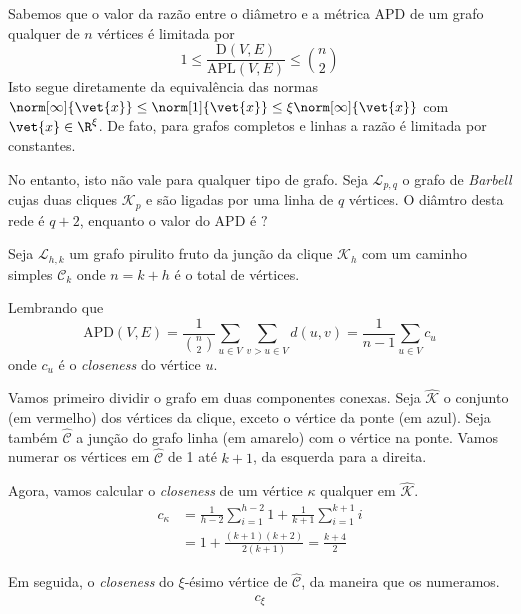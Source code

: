 \documentclass[l15, tikzdraw]{homework}
\begin{document}
	\subquest{} %
	Sabemos que o valor da razão entre o diâmetro e a métrica APD de um grafo qualquer de $n$ vértices é limitada por
		$$1 \le \frac{\text{D}(V, E)}{\text{APL}(V, E)} \le \binom{n}{2}$$
	Isto segue diretamente da equivalência das normas $\norm[\infty]{\vet{x}} \le \norm[1]{\vet{x}} \le \xi \norm[\infty]{\vet{x}}$ com $\vet{x} \in \R^\xi$. De fato, para grafos completos e linhas a razão é limitada por constantes.\par

	No entanto, isto não vale para qualquer tipo de grafo. Seja $\mathcal{L}_{p, q}$ o grafo de \textit{Barbell} cujas duas cliques $\mathcal{K}_p$ e são ligadas por uma linha de $q$ vértices. O diâmtro desta rede é $q + 2$, enquanto o valor do APD é $?$

	\subquest{} %
	Seja $\mathcal{L}_{h, k}$ um grafo pirulito fruto da junção da clique $\mathcal{K}_h$ com um caminho simples $\mathcal{C}_{k}$ onde $n = k + h$ é o total de vértices.
	
	\begin{fig}
		\resizebox{.66\textwidth}{!}{
			
		}
	\end{fig}

	Lembrando que
		$$\text{APD}(V, E) = \frac{1}{\binom{n}{2}} \sum_{u \in V} \sum_{v > u \in V} d(u, v) = \frac{1}{n - 1} \sum_{u \in V} c_u$$
	onde $c_u$ é o \textit{closeness} do vértice $u$.\par

	Vamos primeiro dividir o grafo em duas componentes conexas. Seja $\hat{\mathcal{K}}$ o conjunto (em vermelho) dos vértices da clique, exceto o vértice da ponte (em azul). Seja também $\hat{\mathcal{C}}$ a junção do grafo linha (em amarelo) com o vértice na ponte. Vamos numerar os vértices em $\hat{\mathcal{C}}$ de 1 até $k + 1$, da esquerda para a direita.\par

	Agora, vamos calcular o \textit{closeness} de um vértice $\kappa$ qualquer em $\hat{\mathcal{K}}$.
	\begin{align*}
		c_\kappa &= \frac{1}{h - 2} \sum_{i = 1}^{h - 2} 1 + \frac{1}{k + 1} \sum_{i = 1}^{k + 1} i\\
		&= 1 + \frac{(k + 1) (k + 2)}{2 (k + 1)} = \frac{k + 4}{2}
	\end{align*}

	Em seguida, o \textit{closeness} do $\xi$-ésimo vértice de $\hat{\mathcal{C}}$, da maneira que os numeramos.
	\begin{align*}
		c_\xi
	\end{align*}
\end{document}
